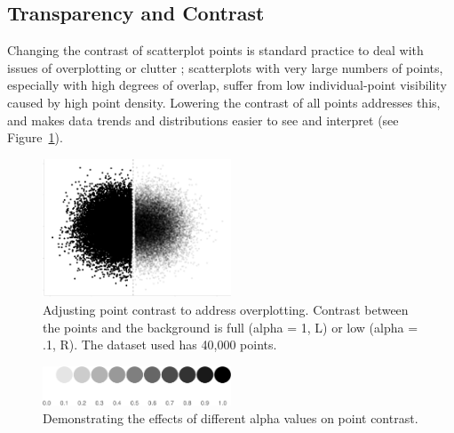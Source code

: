 \documentclass[manuscript, review, anonymous, screen]{acmart}
\begin{document}
\hypertarget{sec-transparency-and-contrast}{%
\subsection{Transparency and
Contrast}\label{sec-transparency-and-contrast}}

Changing the contrast of scatterplot points is standard practice to deal
with issues of overplotting or clutter
\citep{matejka_2015, bertini_2004}; scatterplots with very large numbers
of points, especially with high degrees of overlap, suffer from low
individual-point visibility caused by high point density. Lowering the
contrast of all points addresses this, and makes data trends and
distributions easier to see and interpret (see
Figure~\ref{fig-overplotting-examples}).

\begin{figure}

\includegraphics[width=0.5\textwidth,height=\textheight]{size_and_contrast_new_files/figure-pdf/fig-overplotting-examples-1.pdf} \hfill{}

\caption{\label{fig-overplotting-examples}Adjusting point contrast to
address overplotting. Contrast between the points and the background is
full (alpha = 1, L) or low (alpha = .1, R). The dataset used has 40,000
points.}

\end{figure}

\begin{figure}

\includegraphics[width=0.5\textwidth,height=\textheight]{size_and_contrast_new_files/figure-pdf/fig-alpha-examples-1.pdf} \hfill{}

\caption{\label{fig-alpha-examples}Demonstrating the effects of
different alpha values on point contrast.}

\end{figure}
\end{document}
